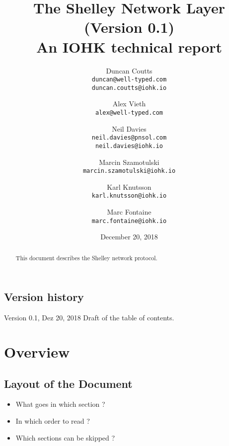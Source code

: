 \documentclass{report}
\theoremstyle{definition}{
  \newtheorem{lemma}{Lemma}[section] %
  \newtheorem{definition}[lemma]{Definition}
}
\theoremstyle{theorem}{
  \newtheorem{invariant}[lemma]{Invariant}
  \newtheorem{proofobligation}[lemma]{Proof Obligation}
}
\numberwithin{equation}{lemma}
\begin{document}
\title{The Shelley Network Layer\\
       {\small (Version 0.1)} \\
       {\large \sc An IOHK technical report}}
\author{Duncan Coutts \\ {\small \texttt{duncan@well-typed.com}} \\
                         {\small \texttt{duncan.coutts@iohk.io}}
   \and Alex Vieth \\ {\small \texttt{alex@well-typed.com}}
   \and Neil Davies \\ {\small \texttt{neil.davies@pnsol.com}} \\
                       {\small \texttt{neil.davies@iohk.io}}
   \and Marcin Szamotulski \\ {\small \texttt{marcin.szamotulski@iohk.io}}
   \and Karl Knutsson \\ {\small \texttt{karl.knutsson@iohk.io}}
   \and Marc Fontaine \\ {\small \texttt{marc.fontaine@iohk.io}}
   }
\date{December 20, 2018}

\maketitle

\begin{abstract}
  This document describes the Shelley network protocol.
\end{abstract}

\tableofcontents

\section*{Version history}

\begin{description}
\item[Version 0.1, Dez 20, 2018  Draft of the table of contents.]
                                  
\end{description}

\chapter{Overview}
\section{Layout of the Document}
\begin{itemize}
\item What goes in which section ?
\item In which order to read ?
\item Which sections can be skipped ?
\end{itemize}
\end{document}
